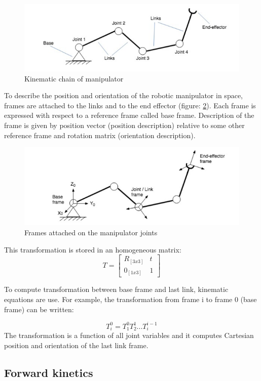 \begin{figure} [!ht]
    \centering
    \includegraphics[width=0.65\linewidth]{images/chain.png}
    \caption{Kinematic chain of manipulator}
    \label{pict:chain}
\end{figure}
\newpage

To describe the position and orientation of the robotic manipulator in space, frames are attached to the links and to the end effector (figure: \ref{pict:frames}). Each frame is expressed with respect to a reference frame called base frame. Description of the frame is given by position vector (position description) relative to some other reference frame and rotation matrix (orientation description).

\begin{figure} [!ht]
    \centering
    \includegraphics[width=0.65\linewidth]{images/frames.png}
    \caption{Frames attached on the manipulator joints}
    \label{pict:frames}
\end{figure}
This transformation is stored in an homogeneous matrix:
\[
T
=
\begin{bmatrix}
    R_{[3x3]} & t \\
    0_{[1x3]} & 1
\end{bmatrix}
\]

To compute transformation between base frame and last link, kinematic equations are use. For example, the transformation from frame {i} to frame {0} (base frame) can be written:

\begin{equation}
    T_i^0=T_1^0 T_2^1 ... T_i^{i-1}
\end{equation}
The transformation is a function of all joint variables and it computes Cartesian position and orientation of the last link frame.

\subsection{Forward kinetics}


